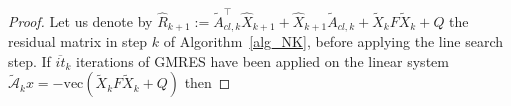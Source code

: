 \documentclass[a4paper,10pt]{article}
\newcommand{\norm}[1]{\left\lVert#1\right\rVert}
\begin{document}
\begin{proof}
%
Let us denote by  $\widehat R_{k+1}:= \tilde{A}_{cl,k}^\top  \widehat{X}_{k+1} + \widehat{X}_{k+1} \tilde{A}_{cl,k} +   \tilde{X}_{k} F \tilde{X}_{k}+Q$ the  residual matrix in step $k$ of Algorithm~\ref{alg_NK}, before applying the line search step. If
 $\overline{it}_k$ iterations of GMRES have been applied on the linear system $\tilde{\mathcal A}_k x=- \mathrm{vec}(\tilde{X}_kF\tilde{X}_k+Q)$ then


\end{proof}
\end{document}
